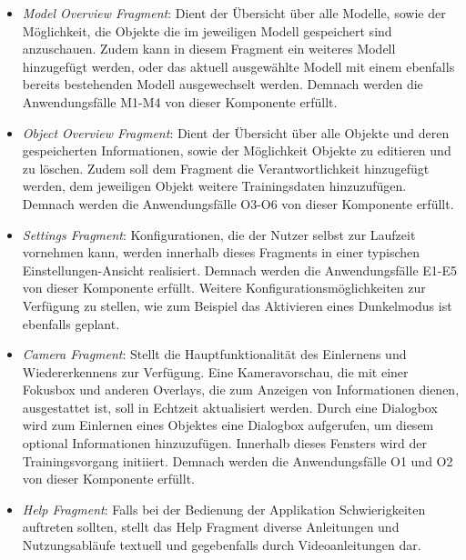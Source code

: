 \documentclass[oneside]{ausarbeitung}
\begin{document}
\begin{itemize}
	\item \textit{Model Overview Fragment}: Dient der Übersicht über alle Modelle, sowie der Möglichkeit, die Objekte die im jeweiligen Modell gespeichert sind anzuschauen. Zudem kann in diesem Fragment ein weiteres Modell hinzugefügt werden, oder das aktuell ausgewählte Modell mit einem ebenfalls bereits bestehenden Modell ausgewechselt werden. Demnach werden die Anwendungsfälle M1-M4 von dieser Komponente erfüllt.

	\item \textit{Object Overview Fragment}: Dient der Übersicht über alle Objekte und deren gespeicherten Informationen, sowie der Möglichkeit Objekte zu editieren und zu löschen. Zudem soll dem Fragment die Verantwortlichkeit hinzugefügt werden, dem jeweiligen Objekt weitere Trainingsdaten hinzuzufügen. Demnach werden die Anwendungsfälle O3-O6 von dieser Komponente erfüllt.
	
	\item \textit{Settings Fragment}: Konfigurationen, die der Nutzer selbst zur Laufzeit vornehmen kann, werden innerhalb dieses Fragments in einer typischen Einstellungen-Ansicht realisiert. Demnach werden die Anwendungsfälle E1-E5 von dieser Komponente erfüllt. Weitere Konfigurationsmöglichkeiten zur Verfügung zu stellen, wie zum Beispiel das Aktivieren eines Dunkelmodus ist ebenfalls geplant.
	
	\item \textit{Camera Fragment}: Stellt die Hauptfunktionalität des Einlernens und Wiedererkennens zur Verfügung. Eine Kameravorschau, die mit einer Fokusbox und anderen Overlays, die zum Anzeigen von Informationen dienen, ausgestattet ist, soll in Echtzeit aktualisiert werden. Durch eine Dialogbox wird zum Einlernen eines Objektes eine Dialogbox aufgerufen, um diesem optional Informationen hinzuzufügen. Innerhalb dieses Fensters wird der Trainingsvorgang initiiert. Demnach werden die Anwendungsfälle O1 und O2 von dieser Komponente erfüllt.
	
	\item \textit{Help Fragment}: Falls bei der Bedienung der Applikation Schwierigkeiten auftreten sollten, stellt das Help Fragment diverse Anleitungen und Nutzungsabläufe textuell und gegebenfalls durch Videoanleitungen dar.

\end{itemize}
\end{document}
